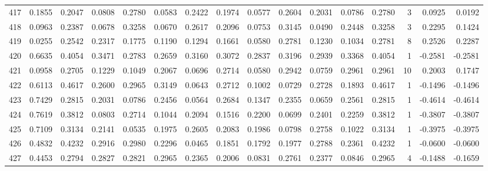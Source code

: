 \begin{tabular}{lrrrrrrrrrrrrrrr}
417 &      0.1855 &  0.2047 &  0.0808 &  0.2780 &  0.0583 &  0.2422 &  0.1974 &  0.0577 &  0.2604 &  0.2031 &   0.0786 &     0.2780 &      3 &                    0.0925 &                     0.0192 \\
418 &      0.0963 &  0.2387 &  0.0678 &  0.3258 &  0.0670 &  0.2617 &  0.2096 &  0.0753 &  0.3145 &  0.0490 &   0.2448 &     0.3258 &      3 &                    0.2295 &                     0.1424 \\
419 &      0.0255 &  0.2542 &  0.2317 &  0.1775 &  0.1190 &  0.1294 &  0.1661 &  0.0580 &  0.2781 &  0.1230 &   0.1034 &     0.2781 &      8 &                    0.2526 &                     0.2287 \\
420 &      0.6635 &  0.4054 &  0.3471 &  0.2783 &  0.2659 &  0.3160 &  0.3072 &  0.2837 &  0.3196 &  0.2939 &   0.3368 &     0.4054 &      1 &                   -0.2581 &                    -0.2581 \\
421 &      0.0958 &  0.2705 &  0.1229 &  0.1049 &  0.2067 &  0.0696 &  0.2714 &  0.0580 &  0.2942 &  0.0759 &   0.2961 &     0.2961 &     10 &                    0.2003 &                     0.1747 \\
422 &      0.6113 &  0.4617 &  0.2600 &  0.2965 &  0.3149 &  0.0643 &  0.2712 &  0.1002 &  0.0729 &  0.2728 &   0.1893 &     0.4617 &      1 &                   -0.1496 &                    -0.1496 \\
423 &      0.7429 &  0.2815 &  0.2031 &  0.0786 &  0.2456 &  0.0564 &  0.2684 &  0.1347 &  0.2355 &  0.0659 &   0.2561 &     0.2815 &      1 &                   -0.4614 &                    -0.4614 \\
424 &      0.7619 &  0.3812 &  0.0803 &  0.2714 &  0.1044 &  0.2094 &  0.1516 &  0.2200 &  0.0699 &  0.2401 &   0.2259 &     0.3812 &      1 &                   -0.3807 &                    -0.3807 \\
425 &      0.7109 &  0.3134 &  0.2141 &  0.0535 &  0.1975 &  0.2605 &  0.2083 &  0.1986 &  0.0798 &  0.2758 &   0.1022 &     0.3134 &      1 &                   -0.3975 &                    -0.3975 \\
426 &      0.4832 &  0.4232 &  0.2916 &  0.2980 &  0.2296 &  0.0465 &  0.1851 &  0.1792 &  0.1977 &  0.2788 &   0.2361 &     0.4232 &      1 &                   -0.0600 &                    -0.0600 \\
427 &      0.4453 &  0.2794 &  0.2827 &  0.2821 &  0.2965 &  0.2365 &  0.2006 &  0.0831 &  0.2761 &  0.2377 &   0.0846 &     0.2965 &      4 &                   -0.1488 &                    -0.1659 \\

\end{tabular}
